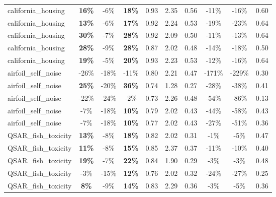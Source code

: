 \begin{table}[!htbp]
\begin{small}
\begin{sc}
{\begin{tabular}{lccccccccc}
california\_housing & \textbf{16\%} & -6\% & \textbf{18\%} & 0.93 & 2.35 & 0.56 & -11\% & -16\% & 0.60 \\
california\_housing & \textbf{13\%} & -6\% & \textbf{17\%} & 0.92 & 2.24 & 0.53 & -19\% & -23\% & 0.64 \\
california\_housing & \textbf{30\%} & -7\% & \textbf{28\%} & 0.92 & 2.09 & 0.50 & -11\% & -13\% & 0.64 \\
california\_housing & \textbf{28\%} & -9\% & \textbf{28\%} & 0.87 & 2.02 & 0.48 & -14\% & -18\% & 0.50 \\
california\_housing & \textbf{19\%} & -5\% & \textbf{20\%} & 0.93 & 2.23 & 0.53 & -12\% & -16\% & 0.64 \\
airfoil\_self\_noise & -26\% & -18\% & -11\% & 0.80 & 2.21 & 0.47 & -171\% & -229\% & 0.30 \\
airfoil\_self\_noise & \textbf{25\%} & -20\% & \textbf{36\%} & 0.74 & 1.28 & 0.27 & -28\% & -38\% & 0.41 \\
airfoil\_self\_noise & -22\% & -24\% & -2\% & 0.73 & 2.26 & 0.48 & -54\% & -86\% & 0.13 \\
airfoil\_self\_noise & -7\% & -18\% & \textbf{10\%} & 0.79 & 2.02 & 0.43 & -44\% & -58\% & 0.43 \\
airfoil\_self\_noise & -7\% & -18\% & \textbf{10\%} & 0.77 & 2.02 & 0.43 & -27\% & -51\% & 0.36 \\
QSAR\_fish\_toxicity & \textbf{13\%} & -8\% & \textbf{18\%} & 0.82 & 2.02 & 0.31 & -1\% & -5\% & 0.47 \\
QSAR\_fish\_toxicity & \textbf{11\%} & -8\% & \textbf{15\%} & 0.85 & 2.37 & 0.37 & -11\% & -10\% & 0.40 \\
QSAR\_fish\_toxicity & \textbf{19\%} & -7\% & \textbf{22\%} & 0.84 & 1.90 & 0.29 & -3\% & -3\% & 0.48 \\
QSAR\_fish\_toxicity & -3\% & -15\% & \textbf{12\%} & 0.76 & 2.02 & 0.32 & -24\% & -27\% & 0.25 \\
QSAR\_fish\_toxicity & \textbf{8\%} & -9\% & \textbf{14\%} & 0.83 & 2.29 & 0.36 & -3\% & -5\% & 0.36 \\
\bottomrule
\end{tabular}
}
\end{sc}
\end{small}
\end{table}
